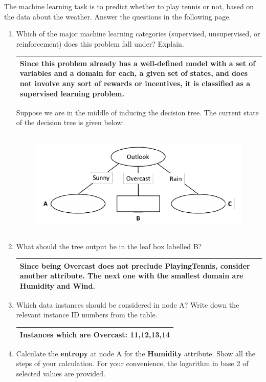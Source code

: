 \documentclass[10pt]{article}
\newenvironment{answer}
    {\begin{center}
    \begin{tabular}{|p{0.9\textwidth}|}
    \hline
    }
    { 
    \\\hline
    \end{tabular} 
    \end{center}
    }
\begin{document}
\begin{enumerate}
\begin{center}
\begin{tabular}{|c|c|c|c|c|c|}
    \end{tabular}
  \end{center}
  The machine learning task is to predict whether to play tennis or not, based on the data
  about the weather. Answer the questions in the following page.
  \begin{enumerate}
  \item Which of the major machine learning categories (supervised,
    unsupervised, or reinforcement) does this problem fall under?
    Explain. 
    \begin{answer}
      Since this problem already has a well-defined model with a set of variables and a domain for each, a given set of states, and does not involve any sort of rewards or incentives, it is classified as a supervised learning problem.
    \end{answer}
    Suppose we are in the middle of inducing the decision tree. The current state of the decision tree
    is given below:
    \begin{figure}[h!]
      \centering
      \includegraphics[width=\textwidth,height=5cm, keepaspectratio]{hw3_1.png}
    \end{figure}
    \item What should the tree output be in the leaf box labelled B? 
      \begin{answer}
        Since being Overcast does not preclude PlayingTennis, consider another attribute. The next one with the smallest domain are Humidity and Wind.
      \end{answer}
    \item Which data instances should be considered in node A? Write down the relevant instance
      ID numbers from the table.
      \begin{answer}
        Instances which are Overcast: 11,12,13,14
      \end{answer}
    \item Calculate the \textbf{entropy} at node A for the \textbf{Humidity} attribute. Show all the steps of your calculation. For your convenience, the logarithm in base 2 of selected values are provided.

\end{enumerate}
\end{enumerate}
\end{document}
